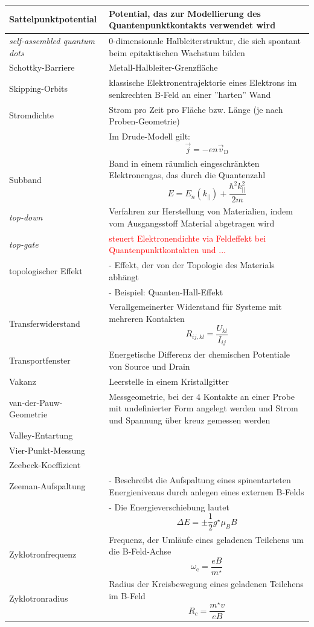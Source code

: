 \documentclass{article}
\begin{document}
\begin{xltabular}{\linewidth}{p{6cm}|X}
	\hline
		Sattelpunktpotential & Potential, das zur Modellierung des Quantenpunktkontakts verwendet wird \\
	\hline
		\textit{self-assembled quantum dots} & 0-dimensionale Halbleiterstruktur, die sich spontant beim epitaktischen Wachstum bilden \\
	\hline
		Schottky-Barriere & Metall-Halbleiter-Grenzfläche \\
	\hline
		Skipping-Orbits & klassische Elektronentrajektorie eines Elektrons im senkrechten B-Feld an einer ''harten'' Wand \\
	\hline
		Stromdichte & Strom pro Zeit pro Fläche bzw. Länge (je nach Proben-Geometrie) \\
		& Im Drude-Modell gilt:
			$$\vec{j} = -en\vec{v}_\text{D}$$ \\
	\hline
		Subband & Band in einem räumlich eingeschränkten Elektronengas, das durch die Quantenzahl
			$$E = E_n(k_{||}) + \frac{\hbar^2k_{||}^2}{2m}$$ \\
	\hline
		\textit{top-down} & Verfahren zur Herstellung von Materialien, indem vom Ausgangsstoff Material abgetragen wird \\
	\hline
		\textit{top-gate} & \textcolor{red}{steuert Elektronendichte via Feldeffekt bei Quantenpunktkontakten und ...} \\
	\hline
		topologischer Effekt & - Effekt, der von der Topologie des Materials abhängt \\
		& - Beispiel: Quanten-Hall-Effekt \\
	\hline
		Transferwiderstand & Verallgemeinerter Widerstand für Systeme mit mehreren Kontakten
			$$R_{ij,kl} = \frac{U_{kl}}{I_{ij}}$$ \\
	\hline
		Transportfenster & Energetische Differenz der chemischen Potentiale von Source und Drain \\
	\hline
		Vakanz & Leerstelle in einem Kristallgitter \\
	\hline
		van-der-Pauw-Geometrie & Messgeometrie, bei der 4 Kontakte an einer Probe mit undefinierter Form angelegt werden und Strom und Spannung über kreuz gemessen werden \\
	\hline
		Valley-Entartung &  \\
	\hline
		Vier-Punkt-Messung &  \\
	\hline
		Zeebeck-Koeffizient &  \\
	\hline
		Zeeman-Aufspaltung & - Beschreibt die Aufspaltung eines spinentarteten Energieniveaus durch anlegen eines externen B-Felds \\
		& - Die Energieverschiebung lautet
			$$\Delta E = \pm \frac{1}{2} g^\star \mu_B B$$ \\
	\hline
		Zyklotronfrequenz & Frequenz, der Umläufe eines geladenen Teilchens um die B-Feld-Achse
			$$\omega_\text{c} = \frac{eB}{m^\star}$$ \\
	\hline
		Zyklotronradius & Radius der Kreisbewegung eines geladenen Teilchens im B-Feld
			$$R_c = \frac{m^\star v}{eB}$$ \\
	\hline\hline
\end{xltabular}
\end{document}
